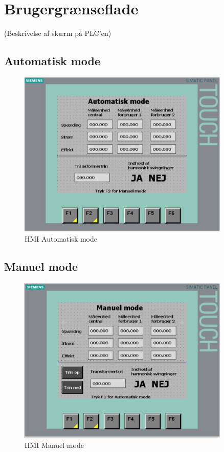 
\section{Brugergrænseflade}
(Beskrivelse af skærm på PLC’en) \\
\subsection{Automatisk mode}
\begin{figure}[H] %
	\centering
	\includegraphics[width=0.9\textwidth]{Figure/HMIAutomatiskMode}
	\caption{HMI Automatisk mode}
	\label{fig:HMIAutomatikMode}
\end{figure}



\subsection{Manuel mode}
\begin{figure}[H] %
	\centering
	\includegraphics[width=0.9\textwidth]{Figure/HMIManuelMode}
	\caption{HMI Manuel mode}
	\label{fig:HMIManuelMode}
\end{figure}